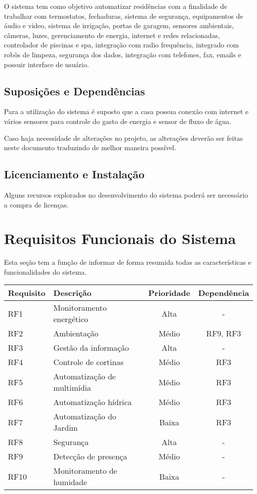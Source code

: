 	O sistema tem como objetivo automatizar residências com a finalidade de trabalhar com termostatos, fechaduras, sistema de segurança, equipamentos de áudio e video, sistema de irrigação, portas de garagem, sensores ambientais, câmeras, luzes, gerenciamento de energia, internet e redes relacionadas, controlador de piscinas e spa, integração com radio frequência, integrado com robôs de limpeza, segurança dos dados, integração com telefones, fax, emails e possuir interface de usuário.

\subsection{Suposições e Dependências}

	Para a utilização do sistema é suposto que a casa possua conexão com internet e vários sensores para controle do gasto de energia e sensor de fluxo de água.
	
	Caso haja necessidade de alterações no projeto, as alterações deverão ser feitas neste documento traduzindo de melhor maneira possível.

\subsection{Licenciamento e Instalação}

	Alguns recursos explorados no desenvolvimento do sistema poderá ser necessário a compra de licenças.


\section{Requisitos Funcionais do Sistema}

	Esta seção tem a função de informar de forma resumida todas as características e funcionalidades do sistema.
	
\begin{tabular}{|l|l|c|c|}
\hline 
\textbf{Requisito} & \textbf{Descrição} & \textbf{Prioridade} & \textbf{Dependência}\tabularnewline
\hline 
\hline 
RF1 & Monitoramento energético & Alta & -\tabularnewline
\hline 
RF2 & Ambientação & Médio & RF9, RF3\tabularnewline
\hline 
RF3 & Gestão da informação & Alta & -\tabularnewline
\hline 
RF4 & Controle de cortinas & Médio & RF3\tabularnewline
\hline 
RF5 & Automatização de multimídia & Médio & RF3\tabularnewline
\hline 
RF6 & Automatização hídrica & Médio & RF3\tabularnewline
\hline 
RF7 & Automatização do Jardim & Baixa & RF3\tabularnewline
\hline 
RF8 & Segurança & Alta & -\tabularnewline
\hline 
RF9 & Detecção de presença & Médio & -\tabularnewline
\hline 
RF10 & Monitoramento de humidade & Baixa & -\tabularnewline
\hline 
\end{tabular}


